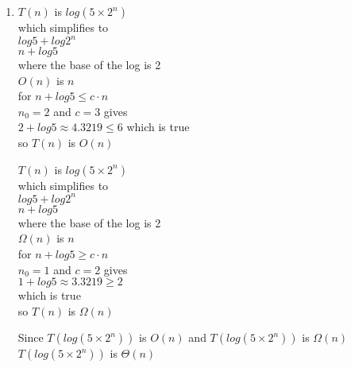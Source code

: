 \documentclass[11pt]{article}
\begin{document}
\begin{enumerate}[label=(\arabic*)\setlength{\listparindent}{\parindent}]
      \item $T(n)$ is $log(5\times 2^n)$\\
\vspace{5pt}
which simplifies to\\
\vspace{5pt}
 $log 5 + log 2^n$\\
\vspace{5pt}
$n + log 5$\\
\vspace{5pt}
 where the base of the log is 2 \\
\vspace{5pt} 
$O(n)$ is $n$\\
\vspace{5pt} 
for $ n + log 5\leq c \cdot n$\\
\vspace{5pt}
 $n_{0} = 2$ and $c = 3$ gives  \\
\vspace{5pt} 
$2+log 5 \approx 4.3219 \leq 6$ which is true \\
\vspace{5pt} 
so $T(n)$ is $O(n)$\\
\begin{center}
\vspace{-207pt}
$T(n)$ is $log(5\times 2^n)$\\
\vspace{5pt}
which simplifies to\\
\vspace{5pt}
 $log 5 + log 2^n$\\
\vspace{5pt}
$n + log 5$\\
\vspace{5pt}
 where the base of the log is 2 \\
\vspace{5pt} 
$\Omega(n)$ is $n$ \\
\vspace{5pt} 
for $n + log 5\geq c \cdot n$\\
\vspace{5pt}
$n_{0} = 1$ and $c = 2$ gives  \\
\vspace{5pt} 
$1+log5 \approx 3.3219 \geq 2$\\
\vspace{5pt} 
 which is true \\
\vspace{5pt} 
so $T(n)$ is $\Omega(n)$
\end{center}
Since $T(log(5\times 2^n))$ is $O(n)$ and $T(log(5\times 2^n))$ is $\Omega(n)$ \\
\vspace{5pt}
$T(log(5\times 2^n))$ is $\Theta(n)$


\end{enumerate}
\end{document}
